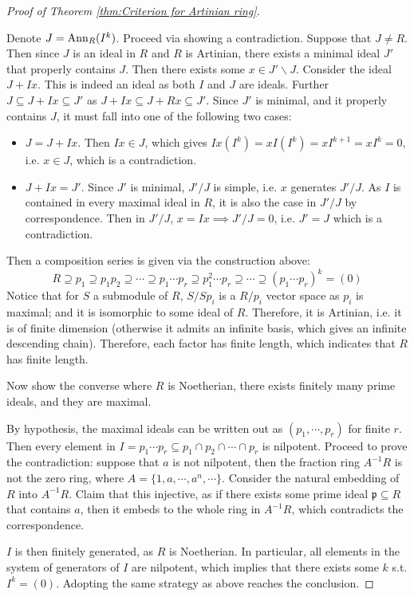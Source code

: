 \documentclass{article}
\begin{document}
\begin{proof}[Proof of Theorem \ref{thm:Criterion for Artinian ring}]
\begin{enumerate}[label=\roman*)]
        Denote $J = \mathrm{Ann}_{R}(I^k)$. Proceed via showing a contradiction. Suppose that $J \neq R$. Then since $J$ is an ideal in $R$ and $R$ is Artinian, there exists a minimal ideal $J'$ that properly contains $J$. Then there exists some $x\in J'\smallsetminus J$. Consider the ideal $J + Ix$. This is indeed an ideal as both $I$ and $J$ are ideals. Further $J \subseteq J + Ix \subseteq J'$ as $J + Ix \subseteq J + Rx \subseteq J'$. Since $J'$ is minimal, and it properly contains $J$, it must fall into one of the following two cases:
        \begin{itemize}
            \item $J = J + Ix$. Then $Ix \in J$, which gives $Ix(I^k) = xI(I^k) = xI^{k+1} = xI^k = 0$, i.e. $x\in J$, which is a contradiction.
            \item $J + Ix = J'$. Since $J'$ is minimal, $J'/J$ is simple, i.e. $x$ generates $J'/J$. As $I$ is contained in every maximal ideal in $R$, it is also the case in $J'/J$ by correspondence. Then in $J'/J$, $x = Ix \implies J'/J = 0$, i.e. $J' = J$ which is a contradiction.
        \end{itemize}
        Then a composition series is given via the construction above:
        \[
            R \supseteq p_1\supseteq p_1 p_2 \supseteq \cdots \supseteq p_1\cdots p_r \supseteq p_1^2\cdots p_r \supseteq \cdots \supseteq (p_1\cdots p_r)^k = (0)
        \]
        Notice that for $S$ a submodule of $R$, $S/Sp_i$ is a $R/p_i$ vector space as $p_i$ is maximal; and it is isomorphic to some ideal of $R$. Therefore, it is Artinian, i.e. it is of finite dimension (otherwise it admits an infinite basis, which gives an infinite descending chain). Therefore, each factor has finite length, which indicates that $R$ has finite length.
    \end{enumerate}
    Now show the converse where $R$ is Noetherian, there exists finitely many prime ideals, and they are maximal. 

    By hypothesis, the maximal ideals can be written out as $(p_1, \cdots, p_r)$ for finite $r$. Then every element in $I = p_1\cdots p_r \subseteq p_1 \cap p_2 \cap \cdots \cap p_r$ is nilpotent. Proceed to prove the contradiction: suppose that $a$ is not nilpotent, then the fraction ring $A^{-1} R$ is not the zero ring, where $A = \{ 1, a, \cdots, a^n, \cdots \}$. Consider the natural embedding of $R$ into $A^{-1}R$. Claim that this injective, as if there exists some prime ideal $\mathfrak{p} \subseteq R$ that contains $a$, then it embeds to the whole ring in $A^{-1}R$, which contradicts the correspondence. 

    $I$ is then finitely generated, as $R$ is Noetherian. In particular, all elements in the system of generators of $I$ are nilpotent, which implies that there exists some $k$ s.t. $I^k = (0)$. Adopting the same strategy as above reaches the conclusion.
\end{proof}
\end{document}

